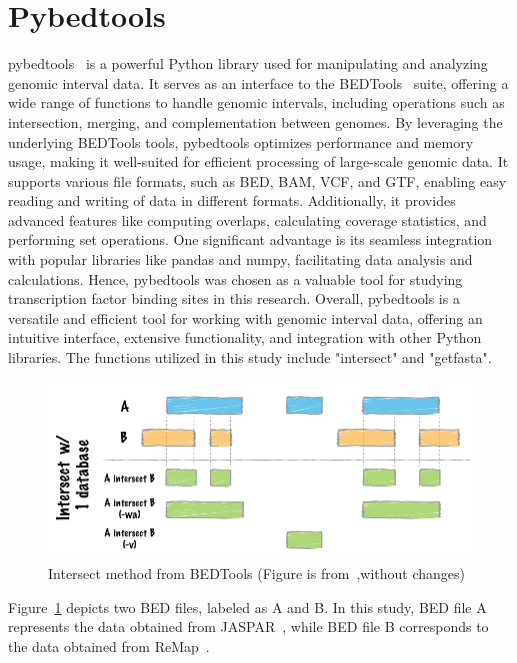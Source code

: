 \documentclass{PHlab-thesis}
\begin{document}
\section{Pybedtools}
pybedtools~\cite{10.1093/bioinformatics/btr539} is a powerful Python library used for manipulating and analyzing genomic interval data. It serves as an interface to the BEDTools~\cite{10.1093/bioinformatics/btq033} suite, offering a wide range of functions to handle genomic intervals, including operations such as intersection, merging, and complementation between genomes. By leveraging the underlying BEDTools tools, pybedtools optimizes performance and memory usage, making it well-suited for efficient processing of large-scale genomic data. It supports various file formats, such as BED, BAM, VCF, and GTF, enabling easy reading and writing of data in different formats. Additionally, it provides advanced features like computing overlaps, calculating coverage statistics, and performing set operations. One significant advantage is its seamless integration with popular libraries like pandas and numpy, facilitating data analysis and calculations. Hence, pybedtools was chosen as a valuable tool for studying transcription factor binding sites in this research. Overall, pybedtools is a versatile and efficient tool for working with genomic interval data, offering an intuitive interface, extensive functionality, and integration with other Python libraries. The functions utilized in this study include "intersect" and "getfasta".
\begin{figure}[H]
	\centering
	\includegraphics[scale=0.5]{figures/intersect-glyph.png}
	\caption{Intersect method from BEDTools (Figure is from~\cite{10.1093/bioinformatics/btq033},without changes)}
	\label{fig:intersect}
\end{figure}
Figure~\ref*{fig:intersect} depicts two BED files, labeled as A and B. In this study, BED file A represents the data obtained from JASPAR~\cite{10.1093/nar/gkab1113}, while BED file B corresponds to the data obtained from ReMap~\cite{ReMapFayrouz2022}.
\end{document}
